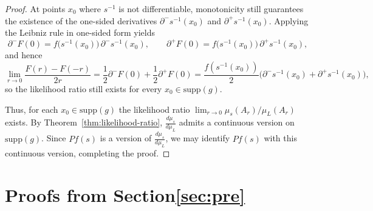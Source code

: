 \documentclass[12pt,leqno]{amsart}
\begin{document}
\begin{proof}
At points $x_0$ where $s^{-1}$ is not differentiable, monotonicity still guarantees the existence
of the one-sided derivatives $\partial^- s^{-1}(x_0)$ and $\partial^+ s^{-1}(x_0)$.
Applying the Leibniz rule in one-sided form yields
\[
\partial^- F(0)= f\big(s^{-1}(x_0)\big)\,\partial^- s^{-1}(x_0),
\qquad
\partial^+ F(0)= f\big(s^{-1}(x_0)\big)\,\partial^+ s^{-1}(x_0),
\]
and hence
\[
\lim_{r\rightarrow 0}\frac{F(r)-F(-r)}{2r}
= \frac{1}{2}\partial^-F(0)+\frac{1}{2}\partial^+F(0)
= \frac{f(s^{-1}(x_0))}{2}\Big(\partial^- s^{-1}(x_0)+\partial^+ s^{-1}(x_0)\Big),
\]
so the likelihood ratio still exists for every $x_0\in \mathrm{supp}(g)$.

Thus, for each $x_0\in \mathrm{supp}(g)$ the likelihood ratio
$\lim_{r\rightarrow0}\mu_s(A_r)/\mu_L(A_r)$ exists.
By Theorem~\ref{thm:likelihood-ratio}, $\frac{d\mu_s}{d\mu_L}$ admits a continuous version on $\mathrm{supp}(g)$.
Since $Pf(s)$ is a version of $\frac{d\mu_s}{d\mu_L}$,
we may identify $Pf(s)$ with this continuous version, completing the proof.
\end{proof}


\section{Proofs from Section\ref{sec:pre}}\label{proof:pre}
\end{document}
